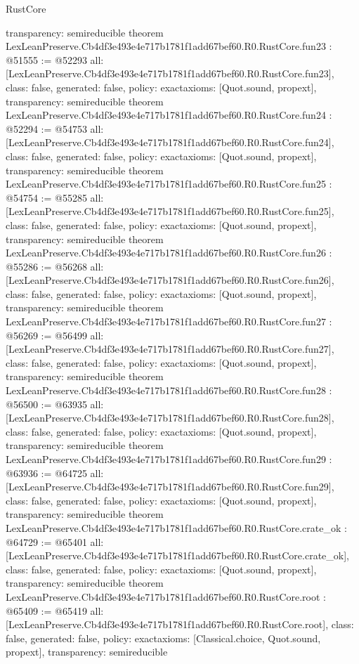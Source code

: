 \begin{lexlean}{RustCore}
\begin{coremodule}
{  transparency: semireducible
}
theorem LexLeanPreserve.Cb4df3e493e4e717b1781f1add67bef60.R0.RustCore.fun23 : @51555 := @52293 {
  all: [LexLeanPreserve.Cb4df3e493e4e717b1781f1add67bef60.R0.RustCore.fun23],
  class: false,
  generated: false,
  policy: exact{axioms: [Quot.sound, propext]},
  transparency: semireducible
}
theorem LexLeanPreserve.Cb4df3e493e4e717b1781f1add67bef60.R0.RustCore.fun24 : @52294 := @54753 {
  all: [LexLeanPreserve.Cb4df3e493e4e717b1781f1add67bef60.R0.RustCore.fun24],
  class: false,
  generated: false,
  policy: exact{axioms: [Quot.sound, propext]},
  transparency: semireducible
}
theorem LexLeanPreserve.Cb4df3e493e4e717b1781f1add67bef60.R0.RustCore.fun25 : @54754 := @55285 {
  all: [LexLeanPreserve.Cb4df3e493e4e717b1781f1add67bef60.R0.RustCore.fun25],
  class: false,
  generated: false,
  policy: exact{axioms: [Quot.sound, propext]},
  transparency: semireducible
}
theorem LexLeanPreserve.Cb4df3e493e4e717b1781f1add67bef60.R0.RustCore.fun26 : @55286 := @56268 {
  all: [LexLeanPreserve.Cb4df3e493e4e717b1781f1add67bef60.R0.RustCore.fun26],
  class: false,
  generated: false,
  policy: exact{axioms: [Quot.sound, propext]},
  transparency: semireducible
}
theorem LexLeanPreserve.Cb4df3e493e4e717b1781f1add67bef60.R0.RustCore.fun27 : @56269 := @56499 {
  all: [LexLeanPreserve.Cb4df3e493e4e717b1781f1add67bef60.R0.RustCore.fun27],
  class: false,
  generated: false,
  policy: exact{axioms: [Quot.sound, propext]},
  transparency: semireducible
}
theorem LexLeanPreserve.Cb4df3e493e4e717b1781f1add67bef60.R0.RustCore.fun28 : @56500 := @63935 {
  all: [LexLeanPreserve.Cb4df3e493e4e717b1781f1add67bef60.R0.RustCore.fun28],
  class: false,
  generated: false,
  policy: exact{axioms: [Quot.sound, propext]},
  transparency: semireducible
}
theorem LexLeanPreserve.Cb4df3e493e4e717b1781f1add67bef60.R0.RustCore.fun29 : @63936 := @64725 {
  all: [LexLeanPreserve.Cb4df3e493e4e717b1781f1add67bef60.R0.RustCore.fun29],
  class: false,
  generated: false,
  policy: exact{axioms: [Quot.sound, propext]},
  transparency: semireducible
}
theorem LexLeanPreserve.Cb4df3e493e4e717b1781f1add67bef60.R0.RustCore.crate_ok : @64729 := @65401 {
  all: [LexLeanPreserve.Cb4df3e493e4e717b1781f1add67bef60.R0.RustCore.crate_ok],
  class: false,
  generated: false,
  policy: exact{axioms: [Quot.sound, propext]},
  transparency: semireducible
}
theorem LexLeanPreserve.Cb4df3e493e4e717b1781f1add67bef60.R0.RustCore.root : @65409 := @65419 {
  all: [LexLeanPreserve.Cb4df3e493e4e717b1781f1add67bef60.R0.RustCore.root],
  class: false,
  generated: false,
  policy: exact{axioms: [Classical.choice, Quot.sound, propext]},
  transparency: semireducible
}


\end{coremodule}
\end{lexlean}
